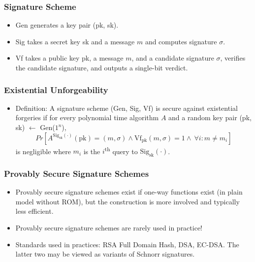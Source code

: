 \documentclass[a4paper]{scrartcl}
\newcommand{\ts}{\textsuperscript}
\begin{document}
\subsubsection*{Signature Scheme}

\begin{itemize}
\item Gen generates a key pair (pk, sk).
\item Sig takes a secret key sk and a message $m$ and computes signature $\sigma$.
\item Vf takes a public key pk, a message $m$, and a candidate signature $\sigma$, verifies the candidate signature, and outputs a single-bit verdict.
\end{itemize}

\subsubsection*{Existential Unforgeability}

\begin{itemize}
\item Definition: A signature scheme (Gen, Sig, Vf) is secure against existential forgeries if for every polynomial time algorithm $A$ and a random key pair (pk, sk) $\gets$ Gen($1^n$),
$$Pr[A^{\text{Sig}_{\text{sk}}(\cdot)}(\text{pk}) = (m, \sigma) \land \text{Vf}_{\text{pk}}(m,\sigma) = 1 \land\ \forall i : m \neq m_i]$$
is negligible where $m_i$ is the $i$\ts{th} query to $\text{Sig}_{\text{sk}}(\cdot)$.
\end{itemize}

\subsubsection*{Provably Secure Signature Schemes}

\begin{itemize}
\item Provably secure signature schemes exist if one-way functions exist (in plain model without ROM), but the construction is more involved and typically less efficient.
\item Provably secure signature schemes are rarely used in practice!
\item Standards used in practices: RSA Full Domain Hash, DSA, EC-DSA. The latter two may be viewed as variants of Schnorr signatures.
\end{itemize}
\end{document}
